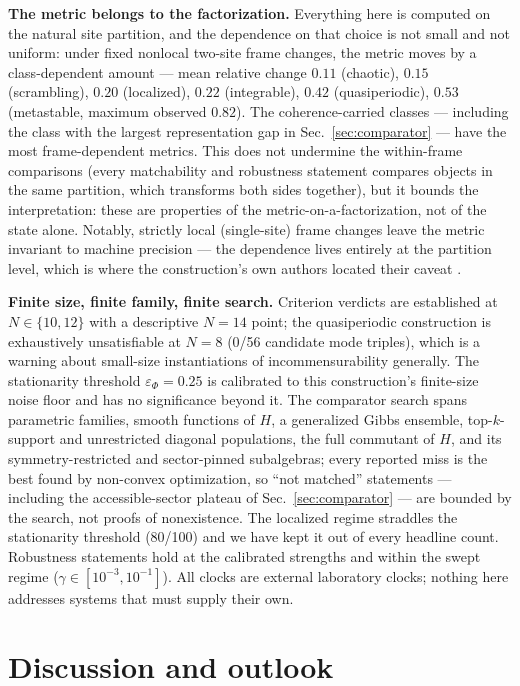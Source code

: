 \documentclass[a4paper,11pt,noarxiv]{quantumarticle}
\newcommand{\ephi}{\varepsilon_\Phi}
\begin{document}
\textbf{The metric belongs to the factorization.} Everything here is
computed on the natural site partition, and the dependence on that
choice is not small and not uniform: under fixed nonlocal two-site
frame changes, the metric moves by a class-dependent amount --- mean
relative change $0.11$ (chaotic), $0.15$ (scrambling), $0.20$
(localized), $0.22$ (integrable), $0.42$ (quasiperiodic), $0.53$
(metastable, maximum observed $0.82$). The coherence-carried classes
--- including the class with the largest representation gap in
Sec.~\ref{sec:comparator} --- have the most frame-dependent metrics. This does not undermine the
within-frame comparisons (every matchability and robustness statement
compares objects in the same partition, which transforms both sides
together), but it bounds the interpretation: these are properties of
the metric-on-a-factorization, not of the state alone. Notably,
strictly local (single-site) frame changes leave the metric invariant
to machine precision --- the dependence lives entirely at the partition
level, which is where the construction's own authors located their
caveat \cite{SRC049}.

\textbf{Finite size, finite family, finite search.} Criterion verdicts
are established at $N \in \{10, 12\}$ with a descriptive $N=14$ point;
the quasiperiodic construction is exhaustively unsatisfiable at $N=8$
(0/56 candidate mode triples), which is a warning about small-size
instantiations of incommensurability generally. The stationarity
threshold $\ephi = 0.25$ is calibrated to this construction's
finite-size noise floor and has no significance beyond it. The
comparator search spans parametric families, smooth functions of $H$,
a generalized Gibbs ensemble, top-$k$-support and unrestricted
diagonal populations, the full commutant of $H$, and its
symmetry-restricted and sector-pinned subalgebras; every reported
miss is the best found by non-convex optimization, so ``not matched''
statements --- including the accessible-sector plateau of
Sec.~\ref{sec:comparator} --- are bounded by the search, not proofs
of nonexistence. The localized regime
straddles the stationarity threshold (80/100) and we have kept it out
of every headline count. Robustness statements hold at the calibrated
strengths and within the swept regime ($\gamma \in [10^{-3},
10^{-1}]$). All clocks are external laboratory clocks; nothing here
addresses systems that must supply their own.

\section{Discussion and outlook}\label{sec:discussion}
\end{document}
